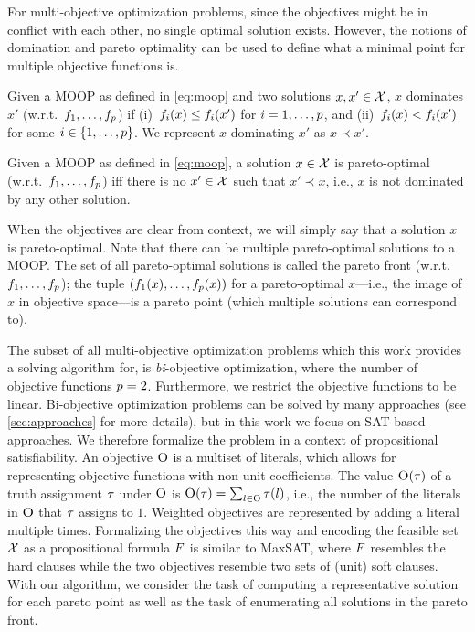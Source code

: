 For multi-objective optimization problems, since the objectives might be in conflict with each other, no single optimal solution exists.
However, the notions of domination and pareto optimality can be used to define what a minimal point for multiple objective functions is.
\begin{definition}
  Given a MOOP as defined in \cref{eq:moop} and two solutions $x,x' \in \mathcal{X}$, $x$ dominates $x'$ (w.r.t.\ $f_1,\dots,f_p$) if (i)~$f_i(x) \leq f_i(x')$ for $i=1,\dots,p$, and (ii)~$f_i(x) < f_i(x')$ for some $i\in\{1,\dots,p\}$.
  We represent $x$ dominating $x'$ as $x \prec x'$.
\end{definition}
\begin{definition}
  Given a MOOP as defined in \cref{eq:moop}, a solution $x \in \mathcal{X}$ is pareto-optimal (w.r.t.\ $f_1,\dots,f_p$) iff there is no $x' \in \mathcal{X}$ such that $x' \prec x$, i.e., $x$ is not dominated by any other solution.
\end{definition}
When the objectives are clear from context, we will simply say that a solution $x$ is pareto-optimal.
Note that there can be multiple pareto-optimal solutions to a MOOP.
The set of all pareto-optimal solutions is called the pareto front (w.r.t.\ $f_1,\dots,f_p$);
the tuple $(f_1(x),\dots,f_p(x))$ for a pareto-optimal $x$---i.e., the image of $x$ in objective space---is a pareto point (which multiple solutions can correspond to).

The subset of all multi-objective optimization problems which this work provides a solving algorithm for, is \emph{bi}-objective optimization, where the number of objective functions $p=2$.
Furthermore, we restrict the objective functions to be linear.
Bi-objective optimization problems can be solved by many approaches (see \cref{sec:approaches} for more details), but in this work we focus on SAT-based approaches.
We therefore formalize the problem in a context of propositional satisfiability.
An objective $\textsc{O}$ is a multiset of literals, which allows for representing objective functions with non-unit coefficients.
The value $\textsc{O}(\tau)$ of a truth assignment $\tau$ under $\textsc{O}$ is $\textsc{O}(\tau) = \sum_{l \in \textsc{O}} \tau(l)$, i.e., the number of the literals in $\textsc{O}$ that $\tau$ assigns to $1$. 
Weighted objectives are represented by adding a literal multiple times.
Formalizing the objectives this way and encoding the feasible set $\mathcal{X}$ as a propositional formula $F$ is similar to MaxSAT, where $F$ resembles the hard clauses while the two objectives resemble two sets of (unit) soft clauses.
With our algorithm, we consider the task of computing a representative solution for each pareto point as well as the task of enumerating all solutions in the pareto front.

